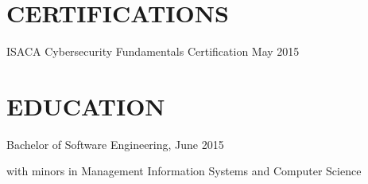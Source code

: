 \documentclass[]{dylan-resume}
\begin{document}
\begin{minipage}[t]{1.00\textwidth}

\section{CERTIFICATIONS}
\vspace{\topsep} %
\begin{tightemize}
\item ISACA Cybersecurity Fundamentals Certification \hspace*{\fill}May 2015
\end{tightemize}
\sectionsep

\section{EDUCATION}
\hspace*{\fill}
\begin{tightemize}
\item Bachelor of Software Engineering, \hspace*{\fill}June 2015 \par with minors in Management Information Systems and Computer Science
\end{tightemize}
\sectionsep

\end{minipage}
\end{document}
